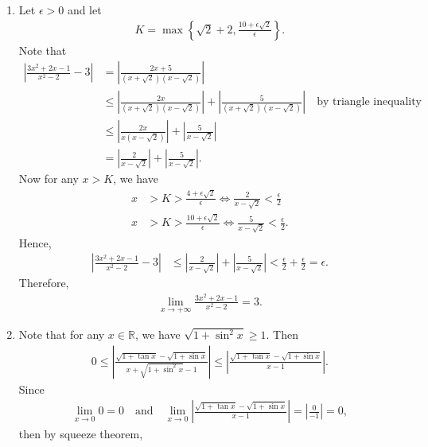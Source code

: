 \documentclass[11pt]{amsart}
\theoremstyle{plain}
\numberwithin{equation}{section}
\begin{document}
\begin{enumerate}[label=\textbf{(\roman*)}]
    \itemsep 0em
    \item Let $\epsilon>0$ and let
\begin{align*}
    K=\max\left\{\sqrt{2}+2,\frac{10+\epsilon\sqrt{2}}{\epsilon}\right\}.
\end{align*}
Note that
\begin{align*}
\left|\frac{3x^{2}+2x-1}{x^{2}-2}-3\right|&=\left|\frac{2x+5}{\left(x+\sqrt{2}\right)\left(x-\sqrt{2}\right)}\right|
\\
&\leq\left|\frac{2x}{\left(x+\sqrt{2}\right)\left(x-\sqrt{2}\right)}\right|+\left|\frac{5}{\left(x+\sqrt{2}\right)\left(x-\sqrt{2}\right)}\right|\quad\text{by triangle inequality}
\\
&\leq\left|\frac{2x}{x\left(x-\sqrt{2}\right)}\right|+\left|\frac{5}{x-\sqrt{2}}\right|
\\
&=\left|\frac{2}{x-\sqrt{2}}\right|+\left|\frac{5}{x-\sqrt{2}}\right|.
\end{align*}
Now for any $x>K$, we have
\begin{align*}
    x&>K>\frac{4+\epsilon\sqrt{2}}{\epsilon}\Longleftrightarrow\frac{2}{x-\sqrt{2}}<\frac{\epsilon}{2}
    \\
    x&>K>\frac{10+\epsilon\sqrt{2}}{\epsilon}\Longleftrightarrow\frac{5}{x-\sqrt{2}}<\frac{\epsilon}{2}.
\end{align*}
Hence,
\begin{align*}
\left|\frac{3x^{2}+2x-1}{x^{2}-2}-3\right|&\leq\left|\frac{2}{x-\sqrt{2}}\right|+\left|\frac{5}{x-\sqrt{2}}\right|<\frac{\epsilon}{2}+\frac{\epsilon}{2}=\epsilon.
\end{align*}
Therefore,
\begin{align*}
    \lim_{x\to+\infty}\frac{3x^{2}+2x-1}{x^{2}-2}=3.
\end{align*}
\item Note that for any $x\in\mathbb{R}$, we have $\sqrt{1+\sin^{2}x}\geq 1$. Then
\begin{align*}
    0\leq\left|\frac{\sqrt{1+\tan x}-\sqrt{1+\sin x}}{x+\sqrt{1+\sin^{2}x}-1}\right|\leq\left|\frac{\sqrt{1+\tan x}-\sqrt{1+\sin x}}{x-1}\right|.
\end{align*}
Since
\begin{align*}
    \lim_{x\to0}0=0\quad\text{and}\quad 
    \lim_{x\to0}\left|\frac{\sqrt{1+\tan x}-\sqrt{1+\sin x}}{x-1}\right|=\left|\frac{0}{-1}\right|=0,
\end{align*}
then by squeeze theorem, 
\begin{align*}

\end{align*}
\end{enumerate}
\end{document}
